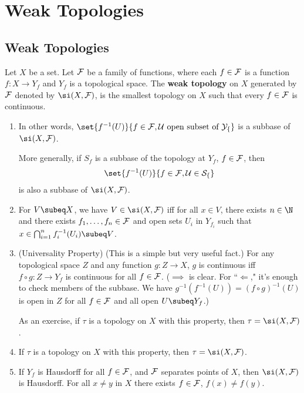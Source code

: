 \chapter{Weak Topologies}
\section{Weak Topologies}
\begin{df}
Let $X$ be a set. Let $\cal F$ be a family of functions, where each $f\in \cal F$ is a function $f:X\to Y_f$ and $Y_f$ is a topological space. The \textbf{weak topology} on $X$ generated by $\cal F$ denoted by $\si(X,\cal F)$, is the smallest topology on $X$ such that every $f\in \cal F$ is continuous. 
\end{df}
\begin{rem}
\begin{enumerate}
\item
In other words, $\set{f^{-1}(U)}{f\in \cal F, U\text{ open subset of }Y_f}$ is a subbase of $\si(X,\cal F)$. 

More generally, if $S_f$ is a subbase of the topology at $Y_f$, $f\in \cal F$, then 
\[
\set{f^{-1}(U)}{f\in \cal F,U\in S_f}
\]
is also a subbase of $\si(X,\cal F)$.
\item
For $V\subeq X$, we have $V\in \si(X,\cal F)$ iff for all $x\in V$, there exists $n\in \N$ and there exists $f_1,\ldots, f_n\in \cal F$ and open sets $U_i$ in $Y_{f_i}$ such that $x\in \bigcap_{i=1}^n f_i^{-1}(U_i)\subeq V$. 
\item (Universality Property) (This is a simple but very useful fact.) For any topological space $Z$ and any function $g:Z\to X$, $g$ is continuous iff $f\circ g:Z\to Y_f$ is continuous for all $f\in \cal F$. ($\implies$ is clear. For ``$\Leftarrow$," it's enough to check members of the subbase. We have $g^{-1}(f^{-1}(U))=(f\circ g)^{-1} (U)$ is open in $Z$ for all $f\in \cal F$ and all open $U\subeq Y_f$.)

As an exercise, if $\tau$ is a topology on $X$ with this property, then $\tau=\si(X,\cal F)$. 
\item
If $\tau$ is a topology on $X$ with this property, then $\tau=\si(X,\cal F)$. 
\item
If $Y_f$ is Hausdorff for all $f\in \cal F$, and $\cal F$ separates points of $X$, then $\si(X, \cal F)$ is Hausdorff. For all $x\ne y$ in $X$ there exists $f\in \cal F$, $f(x)\ne f(y)$. 
\end{enumerate}
\end{rem}
